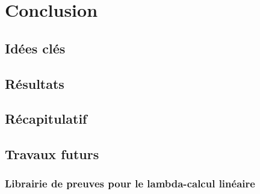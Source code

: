 %
\chapter{Conclusion}
\label{sec::chapitre5}

\section{Idées clés}

\section{Résultats}

\section{Récapitulatif}

\section{Travaux futurs}
\subsection{Librairie de preuves pour le lambda-calcul linéaire}


